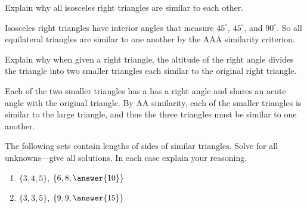 \documentclass[nooutcomes]{ximera}
\begin{document}
\begin{question}Explain why all isosceles right triangles are similar to each other. 
\begin{freeResponse}
\begin{hint}
Isosceles right triangles have interior angles that measure $45^\circ$, $45^\circ$, and $90^\circ$.  So all equilateral triangles are similar to one another by the AAA similarity criterion.  
\end{hint}
\end{freeResponse}
\end{question}

\begin{question}
Explain why when given a right triangle, the altitude of the
  right angle divides the triangle into two smaller triangles each
  similar to the original right triangle.
\begin{freeResponse}
\begin{hint}
Each of the two smaller triangles has a has a right angle and shares an acute angle with the original triangle.  By AA similarity, each of the smaller triangles is similar to the large triangle, and thus the three triangles must be similar to one another.  
\end{hint}
\end{freeResponse}
\end{question}

\begin{question}
The following sets contain lengths of sides of similar
  triangles. Solve for all unknowns---give all solutions. In each case
  explain your reasoning.
\begin{enumerate}
\item $\{3,4,5\}$, $\{6,8,\answer{10}\}$
\item $\{3,3,5\}$, $\{9,9,\answer{15}\}$
\end{enumerate}
\begin{freeResponse}
\begin{hint}
\end{hint}
\end{freeResponse}
\end{question}
\end{document}
